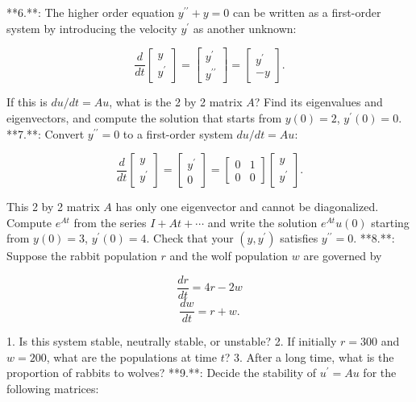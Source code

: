 

**6.**: The higher order equation \(y^{\prime\prime}+y=0\) can be written as a first-order system by introducing the velocity \(y^{\prime}\) as another unknown:

\[\frac{d}{dt}\begin{bmatrix}y\\ y^{\prime}\end{bmatrix}=\begin{bmatrix}y^{\prime}\\ y^{\prime\prime}\end{bmatrix}=\begin{bmatrix}y^{\prime}\\ -y\end{bmatrix}.\]

If this is \(du/dt=Au\), what is the 2 by 2 matrix \(A\)? Find its eigenvalues and eigenvectors, and compute the solution that starts from \(y(0)=2\), \(y^{\prime}(0)=0\).
**7.**: Convert \(y^{\prime\prime}=0\) to a first-order system \(du/dt=Au\):

\[\frac{d}{dt}\begin{bmatrix}y\\ y^{\prime}\end{bmatrix}=\begin{bmatrix}y^{\prime}\\ 0\end{bmatrix}=\begin{bmatrix}0&1\\ 0&0\end{bmatrix}\begin{bmatrix}y\\ y^{\prime}\end{bmatrix}.\]

This 2 by 2 matrix \(A\) has only one eigenvector and cannot be diagonalized. Compute \(e^{At}\) from the series \(I+At+\cdots\) and write the solution \(e^{At}u(0)\) starting from \(y(0)=3\), \(y^{\prime}(0)=4\). Check that your \((y,y^{\prime})\) satisfies \(y^{\prime\prime}=0\).
**8.**: Suppose the rabbit population \(r\) and the wolf population \(w\) are governed by

\[\frac{dr}{dt} =4r-2w\] \[\frac{dw}{dt} =r+w.\]

1. Is this system stable, neutrally stable, or unstable?
2. If initially \(r=300\) and \(w=200\), what are the populations at time \(t\)?
3. After a long time, what is the proportion of rabbits to wolves?
**9.**: Decide the stability of \(u^{\prime}=Au\) for the following matrices:

